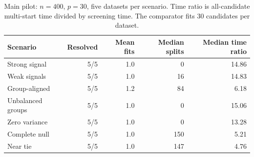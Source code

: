 \begin{table}[H]\centering\small
\begin{tabular}{lrrrr}
\toprule
Scenario & Resolved & Mean fits & Median splits & Median time ratio\\
\midrule
Strong signal & 5/5 & 1.0 & 0 & 14.86\\
Weak signals & 5/5 & 1.0 & 16 & 14.83\\
Group-aligned & 5/5 & 1.2 & 84 & 6.18\\
Unbalanced groups & 5/5 & 1.0 & 0 & 15.06\\
Zero variance & 5/5 & 1.0 & 0 & 13.28\\
Complete null & 5/5 & 1.0 & 150 & 5.21\\
Near tie & 5/5 & 1.0 & 147 & 4.76\\
\bottomrule\end{tabular}
\caption{Main pilot: $n=400$, $p=30$, five datasets per scenario. Time ratio is all-candidate multi-start time divided by screening time. The comparator fits 30 candidates per dataset.}
\end{table}
